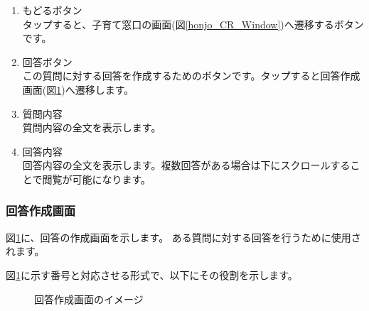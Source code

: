 \documentclass[a4j]{jarticle}
\begin{document}
\begin{enumerate}
  \renewcommand{\labelenumi}{\textcircled{\scriptsize \theenumi}}
  \item もどるボタン\\
        タップすると、子育て窓口の画面(図\ref{honjo_CR_Window})へ遷移するボタンです。
  \item 回答ボタン\\
        この質問に対する回答を作成するためのボタンです。タップすると回答作成画面(図\ref{honjo_CR_CreateAnswer})へ遷移します。
  \item 質問内容\\
        質問内容の全文を表示します。
  \item 回答内容\\
        回答内容の全文を表示します。複数回答がある場合は下にスクロールすることで閲覧が可能になります。
\end{enumerate}

\newpage
\subsubsection{回答作成画面}
図\ref{honjo_CR_CreateAnswer}に、回答の作成画面を示します。
ある質問に対する回答を行うために使用されます。

図\ref{honjo_CR_CreateAnswer}に示す番号と対応させる形式で、以下にその役割を示します。

\begin{figure}[H]
    \begin{center}
    \caption {回答作成画面のイメージ}
    \label{honjo_CR_CreateAnswer}
    \end{center}
\end{figure}
\end{document}
